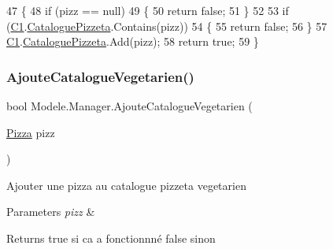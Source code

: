 \begin{DoxyCode}
47         \{
48             \textcolor{keywordflow}{if} (pizz == null)
49             \{
50                 \textcolor{keywordflow}{return} \textcolor{keyword}{false};
51             \}
52 
53             \textcolor{keywordflow}{if} (\hyperlink{classModele_1_1Manager_a54bbc7bd646fcaa0f1a590310dd3c02c}{C1}.\hyperlink{classModele_1_1Catalogue_ac5490e1026b5b08d43e30b68da893423}{CataloguePizzeta}.Contains(pizz))
54             \{
55                 \textcolor{keywordflow}{return} \textcolor{keyword}{false};
56             \}
57             \hyperlink{classModele_1_1Manager_a54bbc7bd646fcaa0f1a590310dd3c02c}{C1}.\hyperlink{classModele_1_1Catalogue_ac5490e1026b5b08d43e30b68da893423}{CataloguePizzeta}.Add(pizz);
58             \textcolor{keywordflow}{return} \textcolor{keyword}{true};
59         \}
\end{DoxyCode}
\mbox{\label{classModele_1_1Manager_a43cd3536e67ca0ec0c4da3c8d8498d7d}} 
\subsubsection{\texorpdfstring{Ajoute\+Catalogue\+Vegetarien()}{AjouteCatalogueVegetarien()}}
{\footnotesize\ttfamily bool Modele.\+Manager.\+Ajoute\+Catalogue\+Vegetarien (\begin{DoxyParamCaption}\item[{\hyperlink{classModele_1_1Pizza}{Pizza}}]{pizz }\end{DoxyParamCaption})\hspace{0.3cm}{\ttfamily [inline]}}



Ajouter une pizza au catalogue pizzeta vegetarien 


\begin{DoxyParams}{Parameters}
{\em pizz} & \\
\hline
\end{DoxyParams}
\begin{DoxyReturn}{Returns}
true si ca a fonctionnné false sinon
\end{DoxyReturn}

